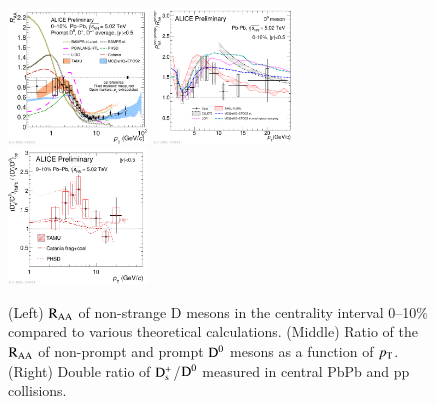 \documentclass[3p,times,procedia]{elsarticle}
\newcommand{\pt}{p_{\rm T}}
\newcommand{\Dzero}{{\rm D^0}}
\newcommand{\Ds}{{\rm D_{s}^+}}
\newcommand{\RAA}{\rm R_{AA}}
\begin{document}
\begin{figure}[h]
\includegraphics[width=0.33\textwidth]{Plots/D/2019-10-31-2019-10-28-DmesonAverage_vs_transportmodels_010_5dot02.pdf}
\includegraphics[width=0.33\textwidth]{Plots/NP/2019-10-31-2019-10-29-D0PbPb5TeV_010_RaaRatio_wModel.pdf}
\includegraphics[width=0.33\textwidth]{Plots/D/2019-10-31-2019-10-28-DoubleRatio_DsOverDzero_PbPb2018_010_pp_WithModels.pdf}
\caption{(Left) $\RAA$ of non-strange D mesons in the centrality interval 0--10$\%$ compared to various theoretical calculations. 
	(Middle) Ratio of the $\RAA$ of non-prompt and prompt $\Dzero$ mesons as a function of $\pt$. 
	(Right) Double ratio of $\Ds$/$\Dzero$ measured in central PbPb and pp collisions.}
\label{fig:prompt_nonpromptRAA}
\end{figure}
\end{document}
